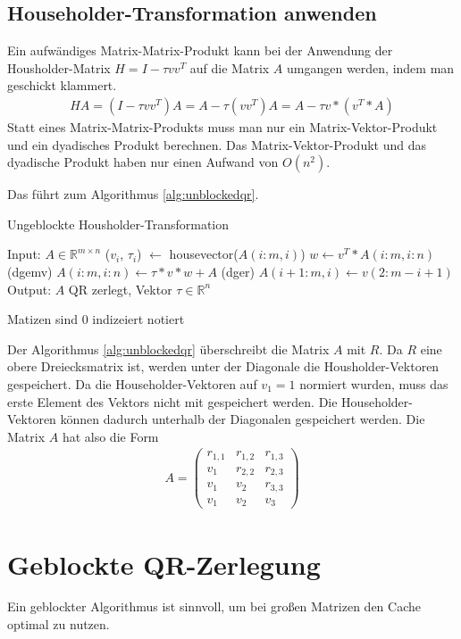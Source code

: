 \subsection{Householder-Transformation anwenden}
Ein aufwändiges Matrix-Matrix-Produkt kann bei der Anwendung der Housholder-Matrix $H = I - \tau vv^T$ auf die Matrix $A$ umgangen werden, indem man geschickt klammert.
\begin{align*} 
H A =(I - \tau vv^T) A= A - \tau (vv^T )A = A - \tau v*(v^T*A)
\end{align*}
Statt eines Matrix-Matrix-Produkts muss man nur ein Matrix-Vektor-Produkt und ein dyadisches Produkt berechnen.
Das Matrix-Vektor-Produkt und das dyadische Produkt haben nur einen Aufwand von $O(n^2)$.

Das führt zum Algorithmus \ref{alg:unblockedqr}. 
\begin{algorithm}
	\caption{Ungeblockte Housholder-Transformation}
	\begin{algorithmic}
	\State Input: $A \in \mathbb{R}^{m \times n}$
		\State ($v_i$, $\tau_i$) $\leftarrow$ housevector($A(i:m,i)$)
		\State $w \leftarrow v^T*A(i:m,i:n)$ (dgemv)
		\State $ A(i:m,i:n) \leftarrow \tau * v * w + A $ (dger)
			\State $A(i + 1 : m, i) \leftarrow v(2 : m - i + 1)$
		\EndIf
	\EndFor	
	\State Output: $A$ QR zerlegt, Vektor $\tau \in \mathbb{R}^n$
\end{algorithmic} 
\label{alg:unblockedqr}
\end{algorithm}

Matizen sind 0 indizeiert notiert

Der Algorithmus \ref{alg:unblockedqr} überschreibt die Matrix $A$ mit $R$. Da $R$ eine obere Dreiecksmatrix ist, werden unter der Diagonale die Housholder-Vektoren gespeichert. Da die Householder-Vektoren auf $v_1 = 1$ normiert wurden, muss das erste Element des Vektors nicht mit gespeichert werden. Die Householder-Vektoren können dadurch unterhalb der Diagonalen gespeichert werden.
Die Matrix $A$ hat also die Form
\begin{align*}
	A = 
	\left(\begin{array}{ccc}
	r_{1,1}   &  r_{1,2}  & r_{1,3} \\ 
	v_1 &  r_{2,2}  & r_{2,3} \\ 
	v_1 & v_2 & r_{3,3} \\ 
	v_1 & v_2 & v_3
	\end{array} \right)
\end{align*}


\section{Geblockte QR-Zerlegung}
Ein geblockter Algorithmus ist sinnvoll, um bei großen Matrizen den Cache optimal zu nutzen.

